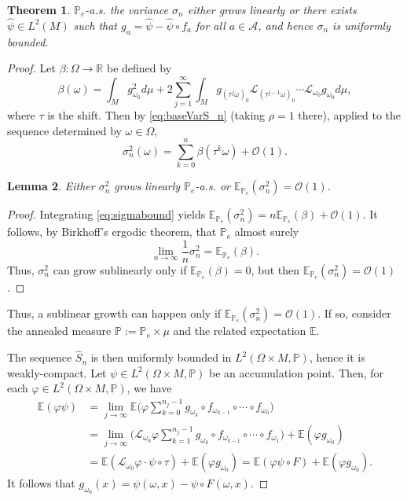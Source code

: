 \documentclass{amsart}
\numberwithin{equation}{section}
\newtheorem{thm}{Theorem}[section]
\newtheorem{lem}[thm]{Lemma}
\newcommand\cA{{\mathcal A}}
\newcommand\cL{{\mathcal L}}
\newcommand\cO{{\mathcal O}}
\newcommand\bE{{\mathbb E}}
\newcommand\bP{{\mathbb P}}
\newcommand\bR{{\mathbb R}}
\newcommand\vf{\varphi}
\newcommand{\Pe}{\bP_{\! e}}
\begin{document}
\begin{thm}\label{thm:random_var} $\Pe$-a.s. the variance $\sigma_n$ either grows linearly or there exists $\hat \psi\in L^2(M)$ such that $g_a=\hat\psi-\hat\psi\circ f_a$ for all $a\in\cA$, and hence $\sigma_n$ is uniformly bounded.
\end{thm}
\begin{proof}
Let $\beta:\Omega\to \bR$ be defined by
\[
\beta(\omega)=\int_{M} g_{\omega_0}^2 d\mu +2 \sum_{j=1}^\infty\int_{M} g_{(\tau^{j}\omega)_0}\cL_{(\tau^{j-1}\omega)_0}\cdots \cL_{\omega_0} g_{\omega_0} d\mu ,
\]
where $\tau$ is the shift. Then by \eqref{eq:baseVarS_n}  (taking $\rho=1$ there),
applied to the sequence determined by $\omega\in\Omega$,
\begin{equation}\label{eq:sigmabound}
\sigma_n^2(\omega)=\sum_{k=0}^n\beta(\tau^k\omega)+\cO(1).
\end{equation}
\begin{lem}\label{lem:alternative}
Either $\sigma_n^2$ grows linearly $\Pe$-a.s. or $\bE_{\Pe}(\sigma_n^2)=\cO(1)$.
\end{lem}
\begin{proof}
Integrating \eqref{eq:sigmabound} yields $\bE_{\Pe}(\sigma_n^2)=n\bE_{\Pe}(\beta)+\cO(1)$.
It follows, by Birkhoff's ergodic theorem, that  $\Pe$ almost surely
\[
\lim_{n\to\infty} \frac 1n\sigma_n^2=\bE_{\Pe}(\beta).
\]
Thus, $\sigma_n^2$ can grow sublinearly only if $\bE_{\Pe}(\beta)=0$, but then $\bE_{\Pe}(\sigma_n^2)=\cO(1)$.
\end{proof}
Thus, a sublinear growth can happen only if $\bE_{\Pe}(\sigma_n^2)=\cO(1)$.
If so, consider the annealed measure $\bP:=\bP_e\times \mu$ and the related expectation $\bE$. 

The sequence $\hat S_n$ is then uniformly bounded in $L^2(\Omega\times M,\bP)$, hence it is weakly-compact. Let $\psi\in L^2(\Omega\times M,\bP)$ be an accumulation point.
Then, for each $\vf\in L^2(\Omega\times M,\bP)$, we have
\[
\begin{split}
\bE(\vf\psi)&=\lim_{j\to\infty}\bE\Big(\vf \sum_{k=0}^{n_j-1}g_{\omega_k}\circ f_{\omega_{k-1}}\circ\cdots\circ f_{\omega_0} \Big)\\
&=\lim_{j\to\infty}\Big(\cL_{\omega_0}\vf \sum_{k=1}^{n_j-1}g_{\omega_k}\circ f_{\omega_{k-1}}\circ\cdots\circ f_{\omega_1}\Big)+\bE(\vf g_{\omega_0})\\
&=\bE\left(\cL_{\omega_0}\vf \cdot \psi\circ\tau\right)+\bE(\vf g_{\omega_0})=\bE(\vf \psi\circ F)+\bE(\vf g_{\omega_0}).
\end{split}
\]
It follows that $g_{\omega_0}(x)=\psi(\omega,x)- \psi\circ F(\omega,x)$. 


\end{proof}
\end{document}
